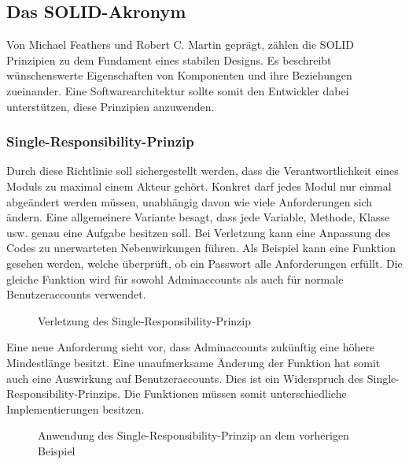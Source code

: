 \documentclass[conference]{IEEEtran}
\begin{document}


\subsection{Das SOLID-Akronym}

Von Michael Feathers und Robert C. Martin geprägt, zählen die SOLID Prinzipien zu dem Fundament eines stabilen Designs. Es beschreibt wünschenswerte Eigenschaften von Komponenten und ihre Beziehungen zueinander. Eine Softwarearchitektur sollte somit den Entwickler dabei unterstützen, diese Prinzipien anzuwenden. 

\subsubsection{Single-Responsibility-Prinzip} Durch diese Richtlinie soll sichergestellt werden, dass die Verantwortlichkeit eines Moduls zu maximal einem Akteur gehört. Konkret darf jedes Modul nur einmal abgeändert werden müssen, unabhängig davon wie viele Anforderungen sich ändern. Eine allgemeinere Variante besagt, dass jede Variable, Methode, Klasse usw. genau eine Aufgabe besitzen soll. Bei Verletzung kann eine Anpassung des Codes zu unerwarteten Nebenwirkungen führen. Als Beispiel kann eine Funktion gesehen werden, welche überprüft, ob ein Passwort alle Anforderungen erfüllt. Die gleiche Funktion wird für sowohl Adminaccounts als auch für normale Benutzeraccounts verwendet. 

\begin{figure}[htbp]
	\small
	
	\caption{Verletzung des Single-Responsibility-Prinzip}
	\label{VorSRP}
\end{figure}


Eine neue Anforderung sieht vor, dass Adminaccounts zukünftig eine höhere Mindestlänge besitzt. Eine unaufmerksame Änderung der Funktion hat somit auch eine Auswirkung auf Benutzeraccounts. Dies ist ein Widerspruch des Single-Responsibility-Prinzips. Die Funktionen müssen somit unterschiedliche Implementierungen besitzen. 

\begin{figure}[htbp]
	\small
	
	\caption{Anwendung des Single-Responsibility-Prinzip an dem vorherigen Beispiel}
	\label{NachSRP}
\end{figure}
\end{document}
